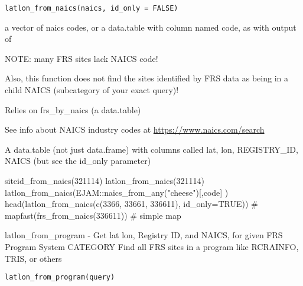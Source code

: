 \documentclass[a4paper]{book}
\begin{document}
%
\begin{Usage}
\begin{verbatim}
latlon_from_naics(naics, id_only = FALSE)
\end{verbatim}
\end{Usage}
%
\begin{Arguments}
\begin{ldescription}
\item[\code{naics}] a vector of naics codes, or
a data.table with column named code, as with output of 
\end{ldescription}
\end{Arguments}
%
\begin{Details}\relax
NOTE: many FRS sites lack NAICS code!

Also, this function does not find the sites
identified by FRS data as being in a child NAICS (subcategory of your exact query)!

Relies on  frs\_by\_naics (a data.table)

See info about NAICS industry codes at \url{https://www.naics.com/search}
\end{Details}
%
\begin{Value}
A data.table (not just data.frame) with columns called
lat, lon, REGISTRY\_ID, NAICS (but see the id\_only parameter)
\end{Value}
%
\begin{Examples}
\begin{ExampleCode}
  siteid_from_naics(321114)
  latlon_from_naics(321114)
  latlon_from_naics(EJAM::naics_from_any("cheese")[,code] )
  head(latlon_from_naics(c(3366, 33661, 336611), id_only=TRUE))
  # mapfast(frs_from_naics(336611)) # simple map
\end{ExampleCode}
\end{Examples}
%
\begin{Description}\relax
latlon\_from\_program - Get lat lon, Registry ID, and NAICS, for given FRS Program System CATEGORY
Find all FRS sites in a program like RCRAINFO, TRIS, or others
\end{Description}
%
\begin{Usage}
\begin{verbatim}
latlon_from_program(query)
\end{verbatim}
\end{Usage}
\end{document}
